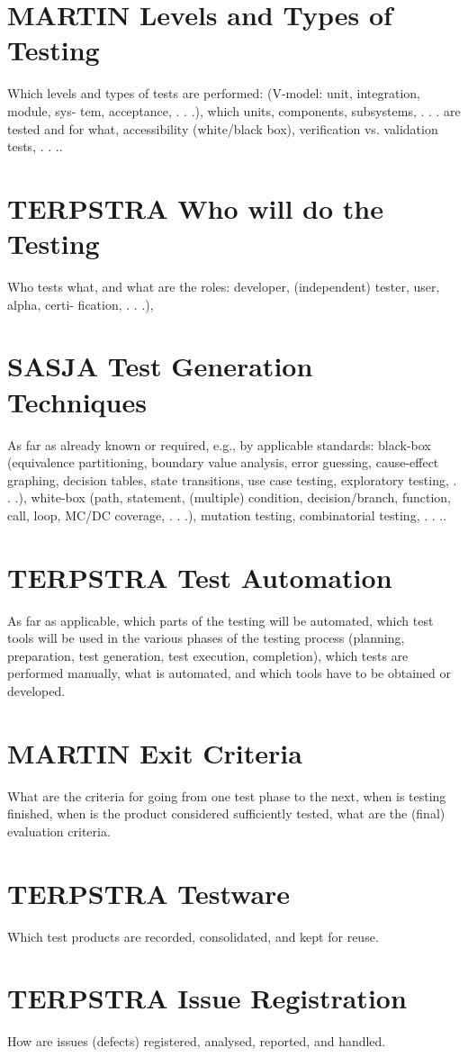 \documentclass[11pt,a4paper]{article}
\begin{document}
\section{MARTIN Levels and Types of Testing}
Which levels and types of tests are performed: (V-model: unit, integration, module, sys-
tem, acceptance, . . .), which units, components, subsystems, . . . are tested and for what,
accessibility (white/black box), verification vs. validation tests, . . ..
\section{TERPSTRA Who will do the Testing}
Who tests what, and what are the roles: developer, (independent) tester, user, alpha, certi-
fication, . . .),
\section{SASJA Test Generation Techniques}
As far as already known or required, e.g., by applicable standards: black-box (equivalence
partitioning, boundary value analysis, error guessing, cause-effect graphing, decision tables,
state transitions, use case testing, exploratory testing, . . .), white-box (path, statement,
(multiple) condition, decision/branch, function, call, loop, MC/DC coverage, . . .), mutation
testing, combinatorial testing, . . ..
\section{TERPSTRA Test Automation}
As far as applicable, which parts of the testing will be automated, which test tools will be
used in the various phases of the testing process (planning, preparation, test generation, test
execution, completion), which tests are performed manually, what is automated, and which
tools have to be obtained or developed.
\section{MARTIN Exit Criteria}
What are the criteria for going from one test phase to the next, when is testing finished,
when is the product considered sufficiently tested, what are the (final) evaluation criteria.
\section{TERPSTRA Testware}
Which test products are recorded, consolidated, and kept for reuse.
\section{TERPSTRA Issue Registration}
How are issues (defects) registered, analysed, reported, and handled.
\end{document}

